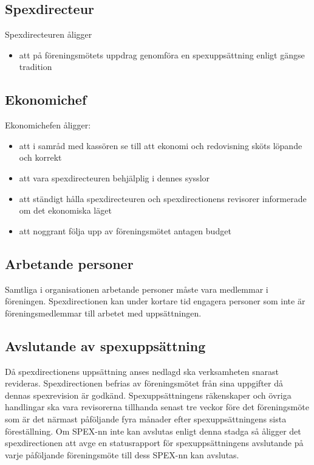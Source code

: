 \documentclass[a4paper]{article}
\begin{document}
\subsection{Spexdirecteur}
Spexdirecteuren åligger

\begin{itemize}
  \item att på föreningsmötets uppdrag genomföra en spexuppsättning enligt gängse tradition
\end{itemize}

\subsection{Ekonomichef}
Ekonomichefen åligger:

\begin{itemize}
  \item att i samråd med kassören se till att ekonomi och redovisning sköts löpande och korrekt
  \item att vara spexdirecteuren behjälplig i dennes sysslor
  \item att ständigt hålla spexdirecteuren och spexdirectionens revisorer informerade om det ekonomiska läget
  \item att noggrant följa upp av föreningsmötet antagen budget
\end{itemize}

\subsection{Arbetande personer}
Samtliga i organisationen arbetande personer måste vara medlemmar i föreningen. Spexdirectionen kan under kortare tid engagera personer som inte är föreningsmedlemmar till arbetet med uppsättningen.

\subsection{Avslutande av spexuppsättning}
Då spexdirectionens uppsättning anses nedlagd ska verksamheten snarast revideras. Spexdirectionen befrias av föreningsmötet från sina uppgifter då dennas spexrevision är godkänd.\newline
\newline
Spexuppsättningens räkenskaper och övriga handlingar ska vara revisorerna tillhanda senast tre veckor före det föreningsmöte som är det närmast påföljande fyra månader efter spexuppsättningens sista föreställning.\newline
\newline
Om SPEX-nn inte kan avslutas enligt denna stadga så åligger det spexdirectionen att avge en statusrapport för spexuppsättningens avslutande på varje påföljande föreningsmöte till dess SPEX-nn kan avslutas.
\end{document}

